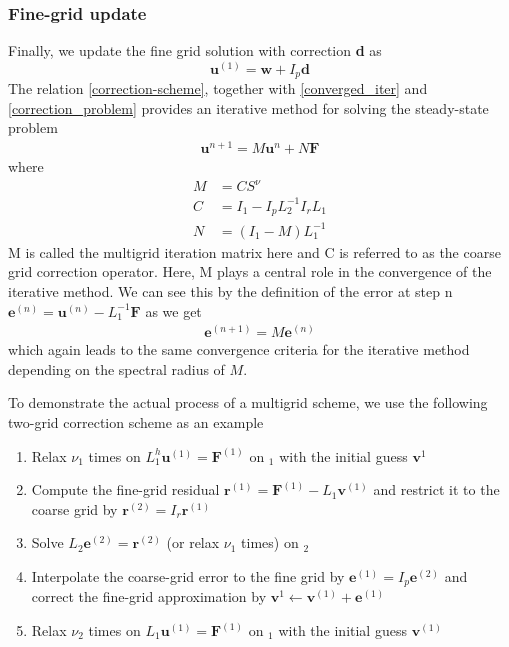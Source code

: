 \subsubsection{Fine-grid update}
Finally, we update the fine grid solution with correction \textbf{d} as
\begin{equation}
    \mathbf{u}^{(1)} = \mathbf{w} + I_p\mathbf{d}
    \label{correction-scheme}
\end{equation}
The relation \autoref{correction-scheme}, together with \autoref{converged_iter} and \autoref{correction_problem} provides an iterative method for solving the steady-state problem 
\begin{align}
    \mathbf{u}^{n+1} = M\mathbf{u}^{n} + N\mathbf{F}
\end{align}
where 
\begin{align}
    M &= CS^\nu \\
    C &= I_1 - I_pL_2^{-1}I_rL_1 \\
    N &= (I_1 - M)L_1^{-1}
\end{align}
M is called the multigrid iteration matrix here and C is referred to as the coarse grid correction operator. Here, M plays a central role in the convergence of the iterative method. We can see this by the definition of the error at step n $\mathbf{e}^{(n)} = \mathbf{u}^{(n)} - L_1^{-1}\mathbf{F}$ as we get
\begin{align}
    \mathbf{e}^{(n+1)} = M\mathbf{e}^{(n)}
\end{align}
which again leads to the same convergence criteria for the iterative method depending on the spectral radius of $M$.

To demonstrate the actual process of a multigrid scheme, we use the following two-grid correction scheme as an example

\begin{enumerate}
    \item Relax $\nu_1$ times on $L_1^h\mathbf{u}^{(1)} = \mathbf{F}^{(1)}$ on \text{$\Omega$}$_1$ with the initial guess $\mathbf{v}^{1}$
    \item Compute the fine-grid residual $\mathbf{r}^{(1)} = \mathbf{F}^(1) - L_1\mathbf{v}^{(1)}$ and restrict it to the coarse grid by $\mathbf{r}^{(2)} = I_r \mathbf{r}^{(1)}$
    \item Solve $L_2\mathbf{e}^{(2)} = \mathbf{r}^{(2)}$ (or relax $\nu_1$ times) on \text{$\Omega$}$_2$
    \item Interpolate the coarse-grid error to the fine grid by $\mathbf{e}^{(1)} = I_p\mathbf{e}^{(2)}$ and correct the fine-grid approximation by $\mathbf{v}^{1} \xleftarrow{} \mathbf{v}^{(1)} + \mathbf{e}^{(1)}$
    \item Relax $\nu_2$ times on $L_1\mathbf{u}^{(1)} = \mathbf{F}^{(1)}$ on \text{$\Omega$}$_1$ with the initial guess $\mathbf{v}^{(1)}$
\end{enumerate}

